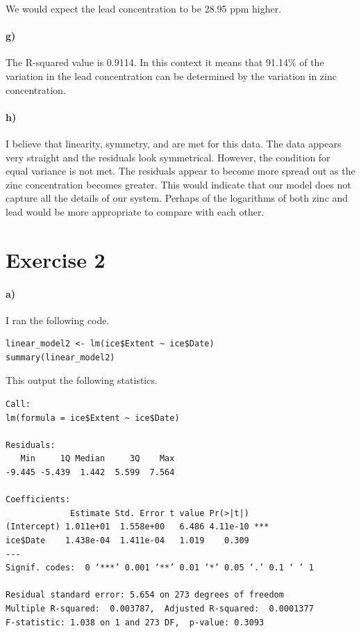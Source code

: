 \documentclass[12pt]{article}
\begin{document}
We would expect the lead concentration to be 28.95 ppm higher.

\paragraph{g)}

The R-squared value is 0.9114. In this context it means that 91.14\% of
the variation in the lead concentration can be determined by the variation in zinc
concentration.

\paragraph{h)}

I believe that linearity, symmetry, and are met for this data. The data appears
very straight and the residuals look symmetrical. However,
the condition for equal variance is not met. The residuals appear to become
more spread out as the zinc concentration becomes greater. This would indicate
that our model does not capture all the details of our system. Perhaps of the
logarithms of both zinc and lead would be more appropriate to compare with each other.

\section*{Exercise 2}

\paragraph{a)}

I ran the following code.
\begin{verbatim}
linear_model2 <- lm(ice$Extent ~ ice$Date)
summary(linear_model2)
\end{verbatim}
This output the following statistics.
\begin{verbatim}
Call:
lm(formula = ice$Extent ~ ice$Date)

Residuals:
   Min     1Q Median     3Q    Max
-9.445 -5.439  1.442  5.599  7.564

Coefficients:
             Estimate Std. Error t value Pr(>|t|)
(Intercept) 1.011e+01  1.558e+00   6.486 4.11e-10 ***
ice$Date    1.438e-04  1.411e-04   1.019    0.309
---
Signif. codes:  0 ‘***’ 0.001 ‘**’ 0.01 ‘*’ 0.05 ‘.’ 0.1 ‘ ’ 1

Residual standard error: 5.654 on 273 degrees of freedom
Multiple R-squared:  0.003787,	Adjusted R-squared:  0.0001377
F-statistic: 1.038 on 1 and 273 DF,  p-value: 0.3093
\end{verbatim}
\end{document}
